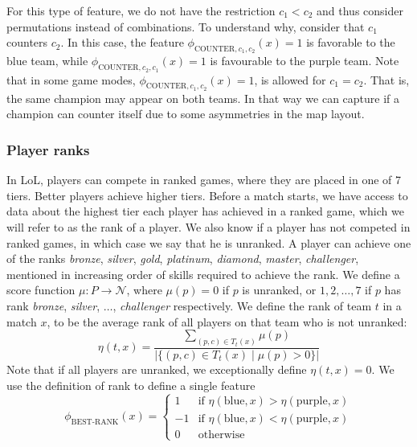 For this type of feature, we do not have the restriction $c_1 < c_2$ and thus consider permutations instead of combinations.
To understand why, consider that $c_1$ counters $c_2$.
In this case, the feature $\phi_{\text{COUNTER},c_1,c_2}(x) = 1$ is favorable to the blue team, while $\phi_{\text{COUNTER},c_2,c_1}(x) = 1$ is favourable to the purple team.
Note that in some game modes, $\phi_{\text{COUNTER},c_1,c_2}(x) = 1$, is allowed for $c_1 = c_2$. That is, the same champion may appear on both teams.
In that way we can capture if a champion can counter itself due to some asymmetries in the map layout.

\subsubsection{Player ranks}
In LoL, players can compete in ranked games, where they are placed in one of 7 tiers. Better players achieve higher tiers.
Before a match starts, we have access to data about the highest tier each player has achieved in a ranked game, which we will refer to as the rank of a player. We also know if a player has not competed in ranked games, in which case we say that he is unranked.
A player can achieve one of the ranks \textit{bronze}, \textit{silver}, \textit{gold}, \textit{platinum}, \textit{diamond}, \textit{master}, \textit{challenger}, mentioned in increasing order of skills required to achieve the rank.
We define a score function $\mu : P \rightarrow \mathcal{N}$, where $\mu(p) = 0$ if $p$ is unranked, or $1, 2, \dots, 7$ if $p$ has rank \textit{bronze}, \textit{silver}, $\dots$, \textit{challenger} respectively.
We define the rank of team $t$ in a match $x$, to be the average rank of all players on that team who is not unranked:
\begin{equation}\label{eq:eta}
\eta(t, x) = \frac{\sum\limits_{(p,c) \in T_t(x)} \mu(p)}{|\{(p, c) \in T_t(x) \mid \mu(p) > 0\}|}
\end{equation}
Note that if all players are unranked, we exceptionally define $\eta(t, x) = 0$. We use the definition of rank to define a single feature
\begin{equation}\label{eq:bestrank}
\phi_\text{BEST-RANK}(x) = 
\begin{cases} 
  1 & \text{if } \eta(\text{blue},x) > \eta(\text{purple},x)\\
  -1 & \text{if } \eta(\text{blue},x) < \eta(\text{purple},x)\\
  0 & \text{otherwise} 
\end{cases}  
\end{equation}

